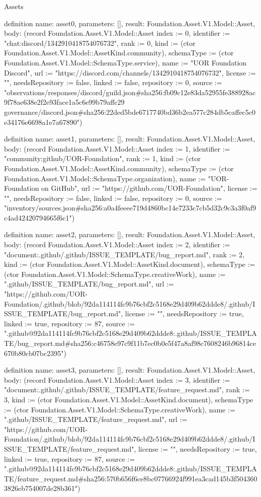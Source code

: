 \begin{lexlean}{Assets}
\begin{semanticmodule}
definition{
  name: asset0,
  parameters: [],
  result: Foundation.Asset.V1.Model::Asset,
  body: (record Foundation.Asset.V1.Model::Asset {index := 0, identifier := "chat:discord/1342910418754076732", rank := 0, kind := (ctor Foundation.Asset.V1.Model::AssetKind.community), schemaType := (ctor Foundation.Asset.V1.Model::SchemaType.service), name := "UOR Foundation Discord", url := "https://discord.com/channels/1342910418754076732", license := "", needsRepository := false, linked := false, repository := 0, source := "observations/responses/discord/guild.json#sha256:fb09c12e83da52955fe388928ac9f78ae638e2f2e93face1a5c6e99b79affc29 governance/discord.json#sha256:22ded5bde6717740bd36b2ea577c284db5caffec5c0e34176e6698a1e7a67890"})
}

definition{
  name: asset1,
  parameters: [],
  result: Foundation.Asset.V1.Model::Asset,
  body: (record Foundation.Asset.V1.Model::Asset {index := 1, identifier := "community:github/UOR-Foundation", rank := 1, kind := (ctor Foundation.Asset.V1.Model::AssetKind.community), schemaType := (ctor Foundation.Asset.V1.Model::SchemaType.organization), name := "UOR-Foundation on GitHub", url := "https://github.com/UOR-Foundation", license := "", needsRepository := false, linked := false, repository := 0, source := "inventory/sources.json#sha256:a0a4feeee719d4860bc14e7233c7cb5d32c9c3a3f0af9c4ad42420794665f6c1"})
}

definition{
  name: asset2,
  parameters: [],
  result: Foundation.Asset.V1.Model::Asset,
  body: (record Foundation.Asset.V1.Model::Asset {index := 2, identifier := "document:.github/.github/ISSUE_TEMPLATE/bug_report.md", rank := 2, kind := (ctor Foundation.Asset.V1.Model::AssetKind.document), schemaType := (ctor Foundation.Asset.V1.Model::SchemaType.creativeWork), name := ".github/ISSUE_TEMPLATE/bug_report.md", url := "https://github.com/UOR-Foundation/.github/blob/92da114114fc9b76cbf2c5168e29d409b62ddde8/.github/ISSUE_TEMPLATE/bug_report.md", license := "", needsRepository := true, linked := true, repository := 87, source := ".github@92da114114fc9b76cbf2c5168e29d409b62ddde8:.github/ISSUE_TEMPLATE/bug_report.md#sha256:c46758e97c9f11b7ec0b0e5f47a8af98c7608246b96814ce670b80cb07bc2395"})
}

definition{
  name: asset3,
  parameters: [],
  result: Foundation.Asset.V1.Model::Asset,
  body: (record Foundation.Asset.V1.Model::Asset {index := 3, identifier := "document:.github/.github/ISSUE_TEMPLATE/feature_request.md", rank := 3, kind := (ctor Foundation.Asset.V1.Model::AssetKind.document), schemaType := (ctor Foundation.Asset.V1.Model::SchemaType.creativeWork), name := ".github/ISSUE_TEMPLATE/feature_request.md", url := "https://github.com/UOR-Foundation/.github/blob/92da114114fc9b76cbf2c5168e29d409b62ddde8/.github/ISSUE_TEMPLATE/feature_request.md", license := "", needsRepository := true, linked := true, repository := 87, source := ".github@92da114114fc9b76cbf2c5168e29d409b62ddde8:.github/ISSUE_TEMPLATE/feature_request.md#sha256:570b656f6ce8bc07766924f991ea3cad145b3f5043603826eb754007de28b361"})
}


\end{semanticmodule}
\end{lexlean}
